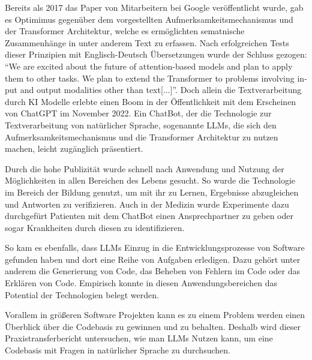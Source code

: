 \documentclass[../main.tex]{subfiles}
\begin{document}
Bereits als 2017 das Paper  von Mitarbeitern bei Google veröffentlicht wurde, gab es Optimimus gegenüber dem vorgestellten Aufmerksamkeitsmechanismus und der Transformer Architektur, welche es ermöglichten sematnische Zusammenhänge in unter anderem Text zu erfassen.
Nach erfolgreichen Tests dieser Prinzipien mit Englisch-Deutsch Übersetzungen wurde der Schluss gezogen: \foreignquote{english}{We are excited about the future of attention-based models and plan to apply them to other tasks. We plan to extend the Transformer to problems involving input and output modalities other than text[...]}\cite*{vaswani2017attention}.
Doch allein die Textverarbeitung durch KI Modelle erlebte einen Boom in der Öffentlichkeit mit dem Erscheinen von ChatGPT im November 2022.
Ein ChatBot, der die Technologie zur Textverarbeitung von natürlicher Sprache, sogenannte \glspl{LLM}, die sich den Aufmerksamkeitsmechanismus und die Transformer Architektur zu nutzen machen, leicht zugänglich präsentiert. \cite{chatgpt2023}

Durch die hohe Publizität wurde schnell nach Anwendung und Nutzung der Möglichkeiten in allen Bereichen des Lebens gesucht.
So wurde die Technologie im Bereich der Bildung genutzt, um mit ihr zu Lernen, Ergebnisse abzugleichen und Antworten zu verifizieren.
Auch in der Medizin wurde Experimente dazu durchgefürt Patienten mit dem ChatBot einen Ansprechpartner zu geben oder sogar Krankheiten durch diesen zu identifizieren.
\cite*{liu2023summary}

So kam es ebenfalls, dass \glspl{LLM} Einzug in die Entwicklungsprozesse von Software gefunden haben und dort eine Reihe von Aufgaben erledigen.
Dazu gehört unter anderem die Generierung von Code, das Beheben von Fehlern im Code oder das Erklären von Code.
Empirisch konnte in diesen Anwendungsbereichen das Potential der Technologien belegt werden.
\cite*{tian2023chatgpt}

Vorallem in größeren Software Projekten kann es zu einem Problem werden einen Überblick über die Codebasis zu gewinnen und zu behalten.
Deshalb wird dieser Praxistransferbericht untersuchen, wie man \glspl{LLM} Nutzen kann, um eine Codebasis mit Fragen in natürlicher Sprache zu durchsuchen.
\end{document}
